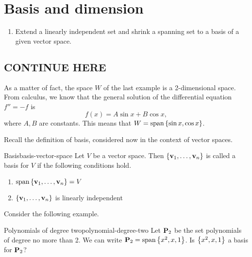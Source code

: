 \section{Basis and dimension}

\begin{outcome}
  \begin{enumerate}
  \item Extend a linearly independent set and shrink a spanning set to
    a basis of a given vector space.
  \end{enumerate}
\end{outcome}

\subsection{CONTINUE HERE}

\begin{example}{}{}
  As a matter of fact, the space $W$ of the last example is a
  2-dimensional space. From calculus, we know that the general solution
  of the differential equation $f''=-f$ is
  \begin{equation*}
    f(x) = A\sin x + B\cos x,
  \end{equation*}
  where $A,B$ are constants. This means that $W=\sspan\set{\sin x, \cos x}$.
\end{example}


Recall the definition of basis, considered now in the context of vector spaces.

\begin{definition}{Basis}{basis-vector-space}
  Let $V$ be a vector space. Then
  $\left\{\mbox{\bf v}_{1},\ldots,\mbox{\bf v}_{n}\right\}$ is called a
  basis for $V$ if the following conditions hold.
  \begin{enumerate}
  \item
    $\sspan\set{\vect{v}_{1},\ldots,\vect{v}_{n}} = V$
  \item
    $\left\{\mbox{\bf v}_{1},\ldots,\mbox{\bf v}_{n}\right\}$ is linearly independent
  \end{enumerate}
\end{definition}

Consider the following example.

\begin{example}{Polynomials of degree two}{polynomial-degree-two}
  Let $\mathbf{P}_2$ be the set polynomials of degree no more than 2. We
  can write $\Poly_2=\sspan\set{x^{2}, x, 1}$. Is $\left\{x^{2}, x, 1\right\} $
  a basis for $\mathbf{P}_2$?
\end{example}

